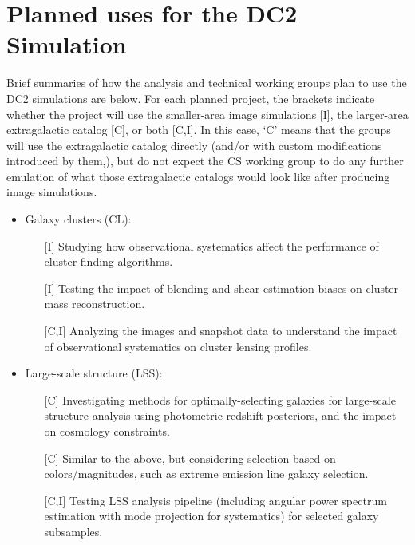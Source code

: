 \documentclass[preprint,times]{aastex61}
\begin{document}
\section{Planned uses for the DC2 Simulation}
\label{sec:plans}

Brief summaries of how the analysis and technical working groups plan to use the DC2 simulations are below.  For each planned project, the brackets indicate whether the project will use the smaller-area image simulations [I], the larger-area extragalactic catalog [C], or both [C,I].  In this case, `C' means that the groups will use the extragalactic catalog directly (and/or with custom modifications introduced by them,), but do not expect the CS working group to do any further emulation of what those extragalactic catalogs would look like after producing image simulations.
\begin{itemize}
\item Galaxy clusters (CL):
\begin{enumerate}
\item[{[I]}] Studying how observational systematics affect the performance of cluster-finding algorithms.
\item[{[I]}] Testing the impact of blending and shear estimation biases on cluster mass reconstruction.
\item[{[C,I]}] Analyzing the images and snapshot data to understand the impact of observational systematics on cluster lensing profiles. 
\end{enumerate}
\item Large-scale structure (LSS):
\begin{enumerate}
\item[{[C]}] Investigating methods for optimally-selecting galaxies for large-scale structure analysis using photometric redshift posteriors, and the impact on cosmology constraints.
\item [{[C]}] Similar to the above, but considering selection based on colors/magnitudes, such as extreme emission line galaxy selection.
\item [{[C,I]}] Testing LSS analysis pipeline (including angular power spectrum estimation with mode projection for systematics) for selected galaxy subsamples.

\end{enumerate}
\end{itemize}
\end{document}
